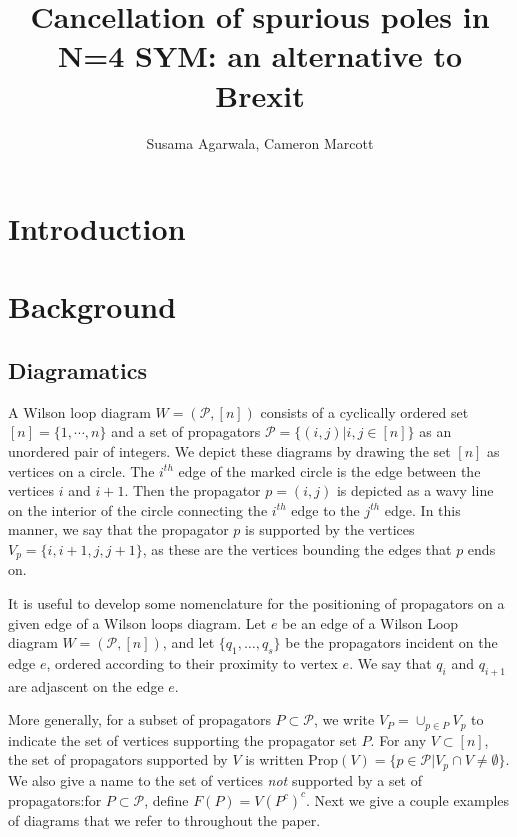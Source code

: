 \documentclass[11pt]{article}
\title{Cancellation of spurious poles in N=4 SYM: an alternative to Brexit}
\author{Susama Agarwala, Cameron Marcott}
\newcommand{\cP}{\mathcal{P}}
\newcommand{\Prop}{\textrm{Prop}}
\theoremstyle{remark}
\theoremstyle{definition}
\begin{document}
\maketitle
\section{Introduction}

\section{Background}

\subsection{Diagramatics \label{sec:diagramdefs}}
A Wilson loop diagram $W = (\cP, [n])$ consists of a cyclically ordered set $[n] = \{1, \cdots, n\}$ and a set of propagators $\cP = \{(i,j) | i, j \in [n]\}$ as an unordered pair of integers. We depict these diagrams by drawing the set $[n]$ as vertices on a circle. The $i^{th}$ edge of the marked circle is the edge between the vertices $i$ and $i+1$. Then the propagator $p =(i,j)$ is depicted as a wavy line on the interior of the circle connecting the $i^{th}$ edge to the $j^{th}$ edge. In this manner, we say that the propagator $p$ is supported by the vertices $V_p = \{i, i+1, j, j+1\}$, as these are the vertices bounding the edges that $p$ ends on. 

It is useful to develop some nomenclature for the positioning of propagators on a given edge of a Wilson loops diagram.  Let $e$ be an edge of a Wilson Loop diagram $W = (\cP, [n])$, and  let $\{q_1, \ldots, q_s \}$ be the propagators incident on the edge $e$, ordered according to their proximity to vertex $e$. We say that $q_i$ and $q_{i+1}$ are adjascent on the edge $e$.

More generally, for a subset of propagators $P \subset \cP$, we write $V_P = \cup_{p \in P} V_p$ to indicate the set of vertices supporting the propagator set $P$. For any $V \subset [n]$, the set of propagators supported by $V$ is written $\Prop(V) = \{ p \in \cP | V_p \cap V \neq \emptyset\}$.  We also give a name to the set of vertices \emph{not} supported by a set of propagators:for $P \subset \cP$, define $F(P) = V(P^c)^c$. Next we give a couple examples of diagrams that we refer to throughout the paper.
\end{document}

